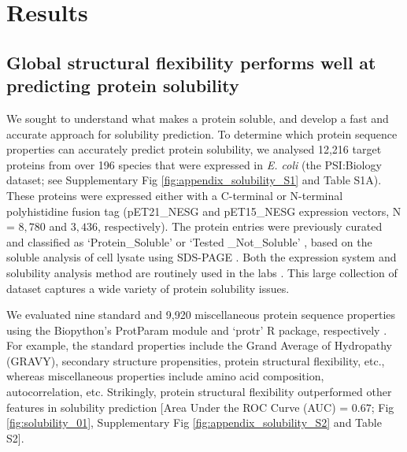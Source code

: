 \section{Results}

\subsection{Global structural flexibility performs well at predicting protein solubility}
We sought to understand what makes a protein soluble, and develop a fast and accurate approach for solubility prediction. To determine which protein sequence properties can accurately predict protein solubility, we analysed 12,216 target proteins from over 196 species that were expressed in \textit{E. coli} \citep{Chen2004-cp,Acton2005-ng} (the PSI:Biology dataset; see Supplementary Fig \ref{fig:appendix_solubility_S1} and Table S1A). These proteins were expressed either with a C-terminal or N-terminal polyhistidine fusion tag (pET21\_NESG and pET15\_NESG expression vectors, N = $8,780$ and $3,436$, respectively). The protein entries were previously curated and classified as ‘Protein\_Soluble’ or ‘Tested \_Not\_Soluble’ \citep{Seiler2014-on}, based on the soluble analysis of cell lysate using SDS-PAGE \citep{Xiao2010-nb}. Both the expression system and solubility analysis method are routinely used in the labs \citep{Costa2014-oe}. This large collection of dataset captures a wide variety of protein solubility issues.

We evaluated nine standard and 9,920 miscellaneous protein sequence properties using the Biopython’s ProtParam module and ‘protr’ R package, respectively \citep{Cock2009-jl,Xiao2015-uw}. For example, the standard properties include the Grand Average of Hydropathy (GRAVY), secondary structure propensities, protein structural flexibility, etc., whereas miscellaneous properties include amino acid composition, autocorrelation, etc. Strikingly, protein structural flexibility outperformed other features in solubility prediction [Area Under the ROC Curve (AUC) = $0.67$; Fig \ref{fig:solubility_01}, Supplementary Fig \ref{fig:appendix_solubility_S2} and Table S2].


